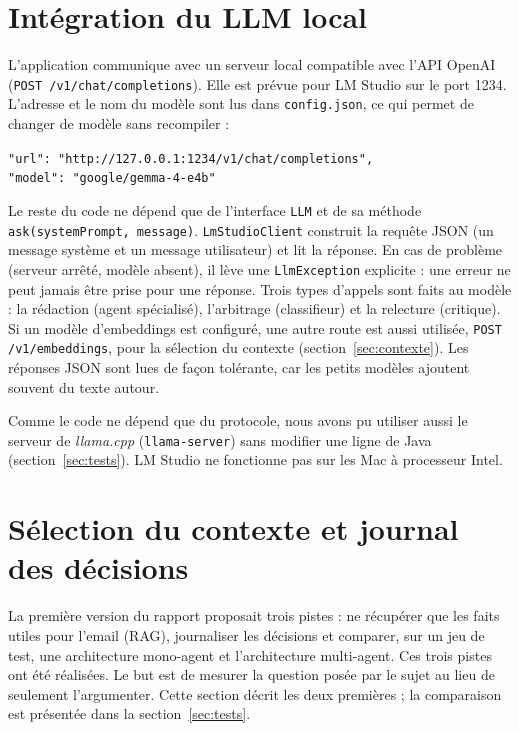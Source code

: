 \documentclass[11pt,a4paper]{article}
\newcommand{\code}[1]{\texttt{#1}}
\begin{document}
\section{Intégration du LLM local}

L'application communique avec un serveur local compatible avec l'API OpenAI
(\code{POST /v1/chat/completions}). Elle est prévue pour LM Studio sur le port 1234.
L'adresse et le nom du modèle sont lus dans \code{config.json}, ce qui permet de changer
de modèle sans recompiler :

\begin{center}
\small
\code{"url": "http://127.0.0.1:1234/v1/chat/completions",}\\
\code{"model": "google/gemma-4-e4b"}
\end{center}

Le reste du code ne dépend que de l'interface \code{LLM} et de sa méthode
\code{ask(systemPrompt, message)}. \code{LmStudioClient} construit la requête JSON
(un message système et un message utilisateur) et lit la réponse. En cas de problème
(serveur arrêté, modèle absent), il lève une \code{LlmException} explicite : une erreur ne
peut jamais être prise pour une réponse. Trois types d'appels sont faits au modèle :
la rédaction (agent spécialisé), l'arbitrage (classifieur) et la relecture (critique).
Si un modèle d'embeddings est configuré, une autre route est aussi utilisée,
\code{POST /v1/embeddings}, pour la sélection du contexte (section~\ref{sec:contexte}).
Les réponses JSON sont lues de façon tolérante, car les petits modèles ajoutent souvent du
texte autour.

Comme le code ne dépend que du protocole, nous avons pu utiliser aussi le serveur de
\emph{llama.cpp} (\code{llama-server}) sans modifier une ligne de Java
(section~\ref{sec:tests}). LM Studio ne fonctionne pas sur les Mac à processeur Intel.

\section{Sélection du contexte et journal des décisions}
\label{sec:extensions}

La première version du rapport proposait trois pistes : ne récupérer que les faits utiles
pour l'email (RAG), journaliser les décisions et comparer, sur un jeu de test, une
architecture mono-agent et l'architecture multi-agent. Ces trois pistes ont été
réalisées. Le but est de mesurer la question posée par le sujet au lieu de seulement
l'argumenter. Cette section décrit les deux premières ; la comparaison est présentée
dans la section~\ref{sec:tests}.
\end{document}
